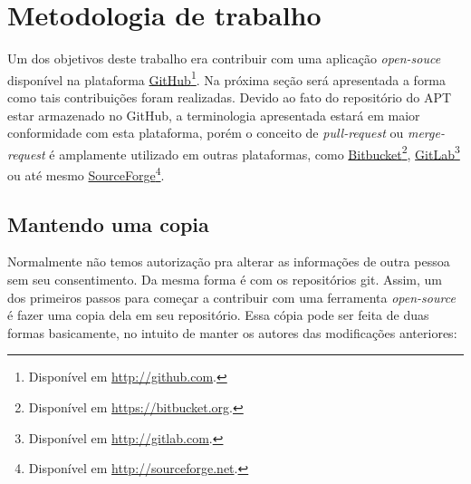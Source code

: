 \section{Metodologia de trabalho} %
\label{sec:contribuindo_com_plataformas_abertas}

Um dos objetivos deste trabalho era contribuir com uma aplicação \textit{open-souce} disponível na plataforma \href{http://github.com}{GitHub}\footnote{Disponível em \url{http://github.com}.}. Na próxima seção será apresentada a forma como tais contribuições foram realizadas. Devido ao fato do repositório do {\code APT} estar armazenado no GitHub, a terminologia apresentada estará em maior conformidade com esta plataforma, porém o conceito de \textit{pull-request} ou  \textit{merge-request} é amplamente utilizado em outras plataformas, como \href{https://bitbucket.org/}{Bitbucket}\footnote{Disponível em \url{https://bitbucket.org}.}, \href{https://gitlab.com/}{GitLab}\footnote{Disponível em \url{http://gitlab.com}.} ou até mesmo \href{http://sourceforge.net/}{SourceForge}\footnote{Disponível em \url{http://sourceforge.net}.}.


\subsection*{Mantendo uma copia} %
\label{sub:mantendo_uma_copia_sua}


Normalmente não temos autorização pra alterar as informações de outra pessoa sem seu consentimento. Da mesma forma  é com os repositórios {\code git}. Assim, um dos primeiros passos para começar a contribuir com uma ferramenta \textit{open-source} é fazer uma copia dela em seu repositório. Essa cópia pode ser feita de duas formas basicamente, no intuito de manter os autores das modificações anteriores:

